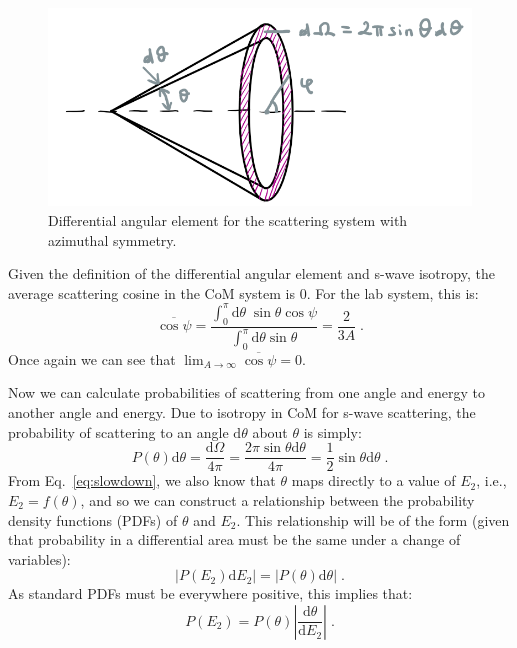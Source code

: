\begin{figure}[h]
  \centering
  \includegraphics[scale=0.50]{./Figures/P1/angular.png} 
  \caption{Differential angular element for the scattering system with azimuthal symmetry.} 
  \label{fig:angular}
\end{figure}

Given the definition of the differential angular element and s-wave isotropy, the average scattering cosine in the CoM system is 0. For the lab system, this is:
\begin{equation*}
    \overline{\cos\psi} = \frac{\int^\pi_0\mathrm{d}\theta\;\sin\theta\cos\psi}{\int^\pi_0\mathrm{d}\theta\sin\theta} =  \frac{2}{3A}\;\mathrm{.}
\end{equation*}
Once again we can see that $\lim_{A\rightarrow\infty}\overline{\cos\psi}=0$.

Now we can calculate probabilities of scattering from one angle and energy to another angle and energy. Due to isotropy in CoM for s-wave scattering, the probability of scattering  to an angle $\mathrm{d}\theta$ about $\theta$ is simply:
\begin{equation*}
    P(\theta)\mathrm{d}\theta = \frac{\mathrm{d}\Omega}{4\pi} = \frac{2\pi\sin\theta\mathrm{d}\theta}{4\pi} = \frac{1}{2}\sin\theta\mathrm{d}\theta\;\mathrm{.}
\end{equation*}
From Eq.~\eqref{eq:slowdown}, we also know that $\theta$ maps directly to a value of $E_2$, i.e., $E_2 = f(\theta)$, and so we can construct a relationship between the probability density functions (PDFs) of $\theta$ and $E_2$. This relationship will be of the form (given that probability in a differential area must be the same under a change of variables):
\begin{equation*}
   |P(E_2)\mathrm{d}E_2| = | P(\theta)\mathrm{d}\theta|\;\mathrm{.}
\end{equation*}
As standard PDFs must be everywhere positive, this implies that:
\begin{equation}\label{eq:prob_equivalence}
    P(E_2) = P(\theta)\left|\frac{\mathrm{d}\theta}{\mathrm{d}E_2}\right|\;\mathrm{.}
\end{equation}

